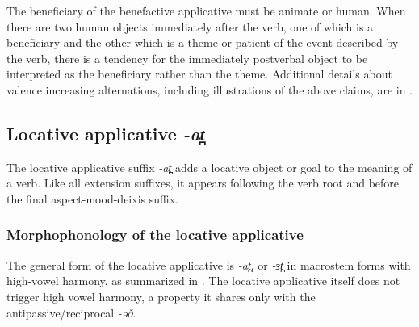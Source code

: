 The beneficiary of the benefactive applicative must be animate or human.  When there are two human objects immediately after the verb, one of which is a beneficiary and the other which is a theme or patient of the event described by the verb, there is a tendency for the immediately postverbal object to be interpreted as the beneficiary rather than the theme. Additional details about valence increasing alternations, including illustrations of the above claims, are in .





%
%		
%

\subsection{Locative applicative \textit{-at̪}}\label{sec:ch11:locappl}

The locative applicative suffix \textit{-at̪} adds a locative object or goal to the meaning of a verb. Like all extension suffixes, it appears following the verb root and before the final aspect-mood-deixis suffix.

\subsubsection{Morphophonology of the locative applicative}\label{sec:ch11:locapplform}

The general form of the locative applicative is \textit{-at̪}, or \textit{-ɜt̪} in macrostem forms with high-vowel harmony, as summarized in . The locative applicative itself does not trigger high vowel harmony, a property it shares only with the antipassive/reciprocal \textit{-əð}.

